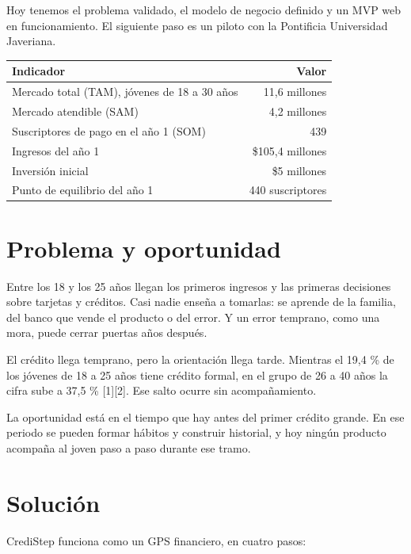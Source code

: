 \documentclass[11pt,a4paper]{article}
\begin{document}
Hoy tenemos el problema validado, el modelo de negocio definido y un MVP web en funcionamiento. El siguiente paso es un piloto con la Pontificia Universidad Javeriana.

\begin{tabularx}{\textwidth}{X r}
  \toprule
  \textbf{Indicador} & \textbf{Valor} \\
  \midrule
  Mercado total (TAM), jóvenes de 18 a 30 años & 11,6 millones \\
  Mercado atendible (SAM) & 4,2 millones \\
  Suscriptores de pago en el año 1 (SOM) & 439 \\
  Ingresos del año 1 & \$105,4 millones \\
  Inversión inicial & \$5 millones \\
  Punto de equilibrio del año 1 & 440 suscriptores \\
  \bottomrule
\end{tabularx}

\section{Problema y oportunidad}

Entre los 18 y los 25 años llegan los primeros ingresos y las primeras decisiones sobre tarjetas y créditos. Casi nadie enseña a tomarlas: se aprende de la familia, del banco que vende el producto o del error. Y un error temprano, como una mora, puede cerrar puertas años después.

El crédito llega temprano, pero la orientación llega tarde. Mientras el 19,4 \% de los jóvenes de 18 a 25 años tiene crédito formal, en el grupo de 26 a 40 años la cifra sube a 37,5 \% [1][2]. Ese salto ocurre sin acompañamiento.

La oportunidad está en el tiempo que hay antes del primer crédito grande. En ese periodo se pueden formar hábitos y construir historial, y hoy ningún producto acompaña al joven paso a paso durante ese tramo.

\section{Solución}

CrediStep funciona como un GPS financiero, en cuatro pasos:
\end{document}
